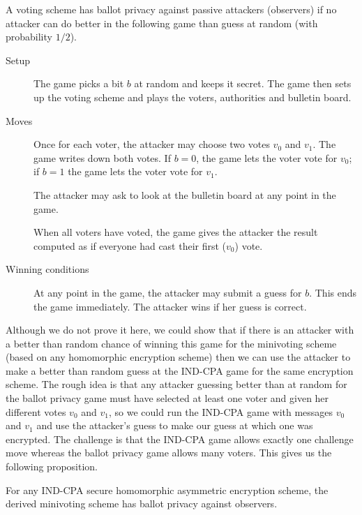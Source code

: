 \documentclass{llncs}
\begin{document}
\begin{definition}
A voting scheme has ballot privacy against passive attackers (observers) if no
attacker can do better in the following game than guess at random (with
probability $1/2$).

\begin{description}
\item[Setup] The game picks a bit $b$ at random and keeps it secret. The game
then sets up the voting scheme and plays the voters, authorities and bulletin
board.

\item[Moves] Once for each voter, the attacker may choose two votes $v_0$ and
$v_1$. The game writes down both votes. If $b = 0$, the game lets the voter vote
for $v_0$; if $b = 1$ the game lets the voter vote for $v_1$.

The attacker may ask to look at the bulletin board at any point in the game.

When all voters have voted, the game gives the attacker the result computed as
if everyone had cast their first ($v_0$) vote.

\item[Winning conditions]
At any point in the game, the attacker may submit a guess for $b$. This ends the
game immediately. The attacker wins if her guess is correct.
\end{description}
\end{definition}

Although we do not prove it here, we could show that if there is an attacker
with a better than random chance of winning this game for the minivoting scheme
(based on any homomorphic encryption scheme) then we can use the attacker to
make a better than random guess at the IND-CPA game for the same encryption
scheme. The rough idea is that any attacker guessing better than at random for
the ballot privacy game must have selected at least one voter and given her
different votes $v_0$ and $v_1$, so we could run the IND-CPA game with messages
$v_0$ and $v_1$ and use the attacker's guess to make our guess at which one was
encrypted. The challenge is that the IND-CPA game allows exactly one challenge
move whereas the ballot privacy game allows many voters. This gives us the
following proposition.

\begin{proposition}
For any IND-CPA secure homomorphic asymmetric encryption scheme, the derived
minivoting scheme has ballot privacy against observers.
\end{proposition}
\end{document}
